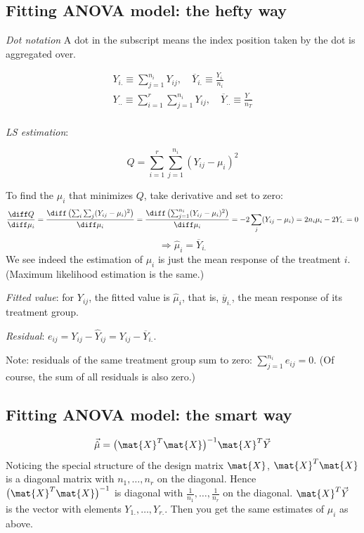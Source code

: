 \documentclass[12pt]{article}
\begin{document}
\subsection{Fitting ANOVA model: the hefty way}

\emph{Dot notation}
A dot in the subscript means the index position taken by the dot is
aggregated over.

\begin{gather*}
Y_{i.} \equiv \sum_{j=1}^{n_i} Y_{ij},\quad
\overline{Y}_{i.} \equiv \frac{Y_{i.}}{n_i}\\
Y_{..} \equiv \sum_{i=1}^r \sum_{j=1}^{n_i} Y_{ij},\quad
\overline{Y}_{..} \equiv \frac{Y_{..}}{n_T}\\
\end{gather*}

\emph{LS estimation}:

\[
Q = \sum_{i=1}^r \sum_{j=1}^{n_i} (Y_{ij} - \mu_i)^2
\]

To find the $\mu_i$ that minimizes $Q$,
take derivative and set to zero:
\[
\frac{\diff Q}{\diff \mu_i}
= \frac{\diff\, \bigl(\sum_i\sum_j (Y_{ij} - \mu_i)^2\bigr)}{\diff \mu_i}
= \frac{\diff\, \bigl(\sum_{j=1}^{n_i} (Y_{ij} - \mu_i)^2\bigr)}{\diff \mu_i}
= -2\sum_j (Y_{ij} - \mu_i)
= 2n_i\mu_i - 2Y_{i.}
= 0
\]
\[
\Longrightarrow
\hat{\mu}_i = \overline{Y}_{i.}
\]
We see indeed the estimation of $\mu_i$
is just the mean response of the treatment $i$.
(Maximum likelihood estimation is the same.)

\emph{Fitted value}:
for $Y_{ij}$, the fitted value is $\hat{\mu}_i$,
that is, $\overline{y}_{i.}$, the mean response of its treatment group.

\emph{Residual}:
$e_{ij} = Y_{ij} - \hat{Y}_{ij} = Y_{ij} - \overline{Y}_{i.}$.

Note: residuals of the same treatment group sum to zero:
$\sum_{j=1}^{n_i} e_{ij} = 0$.
(Of course, the sum of all residuals is also zero.)


\subsection{Fitting ANOVA model: the smart way}

\[
\vec{\hat{\mu}}
= \bigl(\mat{X}^T\mat{X}\bigr)^{-1} \mat{X}^T \vec{Y}
\]
Noticing the special structure of the design matrix $\mat{X}$,
$\mat{X}^T\mat{X}$ is a diagonal matrix with
$n_1,\dotsc,n_r$ on the diagonal.
Hence $\bigl(\mat{X}^T\mat{X}\bigr)^{-1}$ is diagonal with
$\frac{1}{n_1},\dotsc,\frac{1}{n_r}$ on the diagonal.
$\mat{X}^T\vec{Y}$ is the vector with elements
$Y_{1.},\dotsc,Y_{r.}$.
Then you get the same estimates of $\mu_i$ as above.
\end{document}
